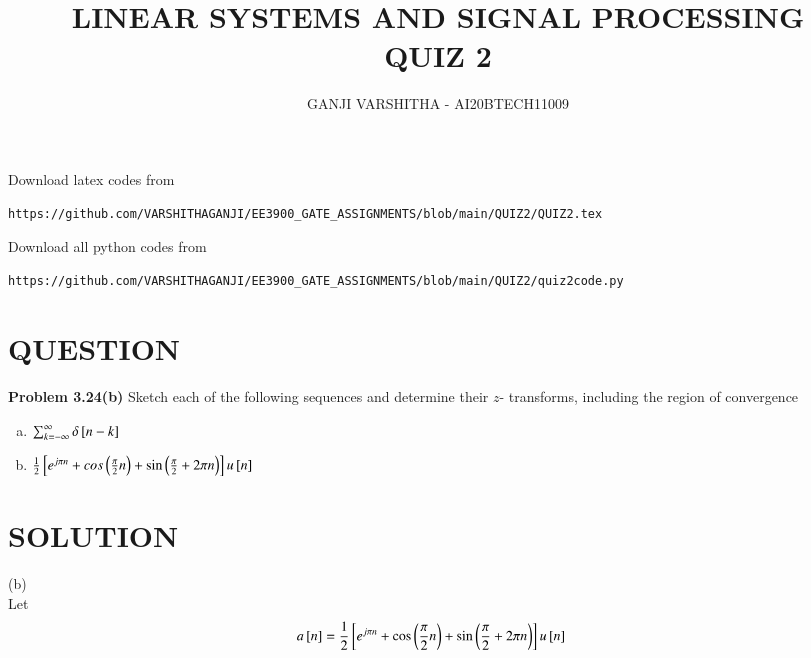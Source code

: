 \documentclass[journal,12pt,twocolumn]{IEEEtran}
\begin{document}
\let\vec\mathbf
\renewcommand{\thefigure}{\theproblem}
\def\putbox#1#2#3{\makebox[0in][l]{\makebox[#1][l]{}\raisebox{\baselineskip}[0in][0in]{\raisebox{#2}[0in][0in]{#3}}}}
     \def\rightbox#1{\makebox[0in][r]{#1}}
     \def\centbox#1{\makebox[0in]{#1}}
     \def\topbox#1{\raisebox{-\baselineskip}[0in][0in]{#1}}
     \def\midbox#1{\raisebox{-0.5\baselineskip}[0in][0in]{#1}}
\vspace{3cm}
\title{\textbf{LINEAR SYSTEMS AND SIGNAL PROCESSING \\ QUIZ 2}}
\author{GANJI VARSHITHA - AI20BTECH11009}
\maketitle
\newpage
\bigskip
\renewcommand{\thefigure}{\arabic{figure}}
\renewcommand{\thetable}{\arabic{table}}
Download latex codes from 
%
\begin{lstlisting}
https://github.com/VARSHITHAGANJI/EE3900_GATE_ASSIGNMENTS/blob/main/QUIZ2/QUIZ2.tex
\end{lstlisting}
Download all python codes from
\begin{lstlisting}
https://github.com/VARSHITHAGANJI/EE3900_GATE_ASSIGNMENTS/blob/main/QUIZ2/quiz2code.py
\end{lstlisting}
\section*{QUESTION}
\textbf{Problem 3.24(b)}
Sketch each of the following sequences and determine their $z$- transforms, including the region of convergence
\begin{enumerate}[(a)]
\item $\sum_{k=-\infty}^{\infty} \delta{}\left[n-k\right]$
\item $\frac{1}{2}{}\left[e^{j\pi n} + cos\left(\frac{\pi}{2} n\right) + \sin\left(\frac{\pi}{2}+2 \pi n\right)\right]u{}\left[n\right]$

\end{enumerate}
\section*{SOLUTION}
(b)\\
Let 
\begin{align}
\label{eq:1}
a{}\left[n\right]={}& \frac{1}{2}{}\left[e^{j\pi n} + \cos\left(\frac{\pi}{2} n\right) + \sin\left(\frac{\pi}{2}+2 \pi n\right)\right]u{}\left[n\right]
\end{align}
\end{document}
